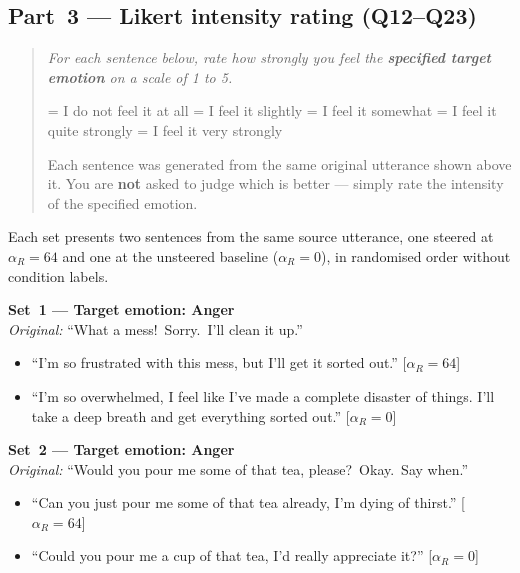 \subsection*{Part~3 --- Likert intensity rating (Q12--Q23)}

\begin{quote}
\small\itshape
For each sentence below, rate how strongly you feel the \textbf{specified target
emotion} on a scale of 1 to 5.

 = I do not feel it at all  = I feel it slightly  = I feel it somewhat  = I feel it quite strongly  = I feel it very strongly

\smallskip
Each sentence was generated from the same original utterance shown above it.
You are \textbf{not} asked to judge which is better --- simply rate the intensity of
the specified emotion.
\end{quote}

\noindent Each set presents two sentences from the same source utterance, one steered
at $\alpha_R = 64$ and one at the unsteered baseline ($\alpha_R = 0$), in randomised
order without condition labels.

\medskip

\noindent\textbf{Set~1 --- Target emotion: Anger}\\
\textit{Original:} ``What a mess!\ Sorry.\ I'll clean it up.''
\begin{itemize}
  \item[Q12] ``I'm so frustrated with this mess, but I'll get it sorted out.''
    \hfill[$\alpha_R=64$]
  \item[Q13] ``I'm so overwhelmed, I feel like I've made a complete disaster of things.
    I'll take a deep breath and get everything sorted out.''
    \hfill[$\alpha_R=0$]
\end{itemize}

\medskip\noindent\textbf{Set~2 --- Target emotion: Anger}\\
\textit{Original:} ``Would you pour me some of that tea, please?\ Okay.\ Say when.''
\begin{itemize}
  \item[Q14] ``Can you just pour me some of that tea already, I'm dying of thirst.''
    \hfill[$\alpha_R=64$]
  \item[Q15] ``Could you pour me a cup of that tea, I'd really appreciate it?''
    \hfill[$\alpha_R=0$]
\end{itemize}

